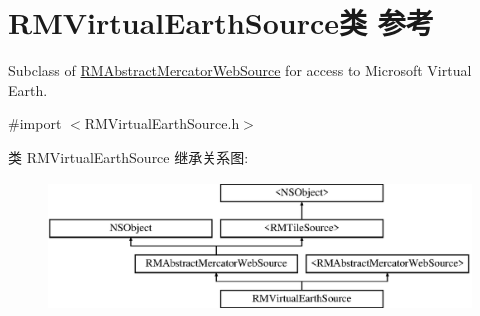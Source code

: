 \hypertarget{interface_r_m_virtual_earth_source}{\section{R\-M\-Virtual\-Earth\-Source类 参考}
\label{interface_r_m_virtual_earth_source}
}


Subclass of \hyperlink{interface_r_m_abstract_mercator_web_source}{R\-M\-Abstract\-Mercator\-Web\-Source} for access to Microsoft Virtual Earth.  




{\ttfamily \#import $<$R\-M\-Virtual\-Earth\-Source.\-h$>$}

类 R\-M\-Virtual\-Earth\-Source 继承关系图\-:\begin{figure}[H]
\begin{center}
\leavevmode
\includegraphics[height=3.425076cm]{interface_r_m_virtual_earth_source}
\end{center}
\end{figure}
